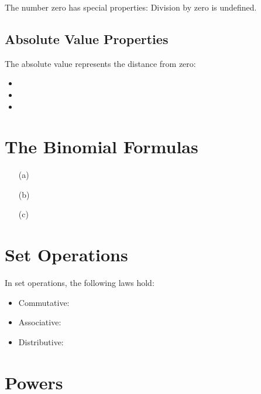 The number zero has special properties:
Division by zero is undefined.


\subsection{Absolute Value Properties}\label{Absolute Value Properties}

The absolute value represents the distance from zero:
\begin{itemize} \item {} \item {} \item {} \end{itemize}

\section{The Binomial Formulas}\label{Binomial Formulas}

\begin{enumerate}
    \item[(a)] 
    \item[(b)] 
    \item[(c)] 
\end{enumerate}

\section{Set Operations}\label{Set Operations}

In set operations, the following laws hold:
\begin{itemize} \item Commutative:   \item Associative:   \item Distributive:  \end{itemize}

\section{Powers}\label{Powers}


